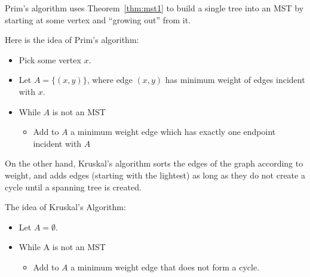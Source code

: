 Prim's algorithm uses Theorem~\ref{thm:mst1} to build a single
tree into an MST by starting at some vertex and ``growing out''
from it.

\begin{exa}
Here is the idea of Prim's algorithm:
\begin{itemize}
\item
Pick some vertex $x$.
\item
Let $A=\{(x,y)\}$, where edge $(x,y)$ has minimum weight of 
edges incident with $x$.
\item
While $A$ is not an MST
\begin{itemize}
\item
Add to $A$ a minimum weight edge which has 
exactly one endpoint incident with $A$
\end{itemize}
\end{itemize}
\end{exa}

On the other hand, Kruskal's algorithm 
sorts the edges of the graph according to weight, and adds
edges (starting with the lightest) as long as they do not create
a cycle until a spanning tree is created.

\begin{exa}
The idea of Kruskal's Algorithm:
\begin{itemize}
\item
Let $A=\emptyset$.
\item
While A is not an MST
\begin{itemize}
\item
Add to $A$ a minimum weight edge that does not form a cycle.
\end{itemize}
\end{itemize}
\end{exa}

\newpage

